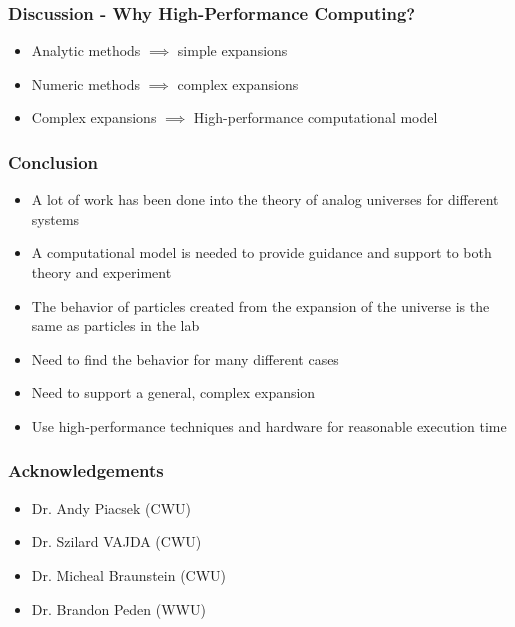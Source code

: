\documentclass[aspectratio=169]{beamer}
\begin{document}
\begin{frame}
    \frametitle{Discussion - Why High-Performance Computing?}

    \begin{itemize}
        \item Analytic methods $\implies$ simple expansions
        \item Numeric methods $\implies$ complex expansions
        \item Complex expansions $\implies$ High-performance computational model
    \end{itemize}

\end{frame}

\begin{frame}
    \frametitle{Conclusion}

    \begin{itemize}
        \item A lot of work has been done into the theory of analog universes for different systems
        \item A computational model is needed to provide guidance and support to both theory and experiment
        \item The behavior of particles created from the expansion of the universe is the same as particles in the lab
        \item Need to find the behavior for many different cases
        \item Need to support a general, complex expansion
        \item Use high-performance techniques and hardware for reasonable execution time
    \end{itemize}

\end{frame}

\begin{frame}
    \frametitle{Acknowledgements}

    \begin{itemize}
        \item Dr. Andy Piacsek (CWU)
        \item Dr. Szilard VAJDA (CWU)
        \item Dr. Micheal Braunstein (CWU)
        \item Dr. Brandon Peden (WWU)
    \end{itemize}

\end{frame}
\end{document}
